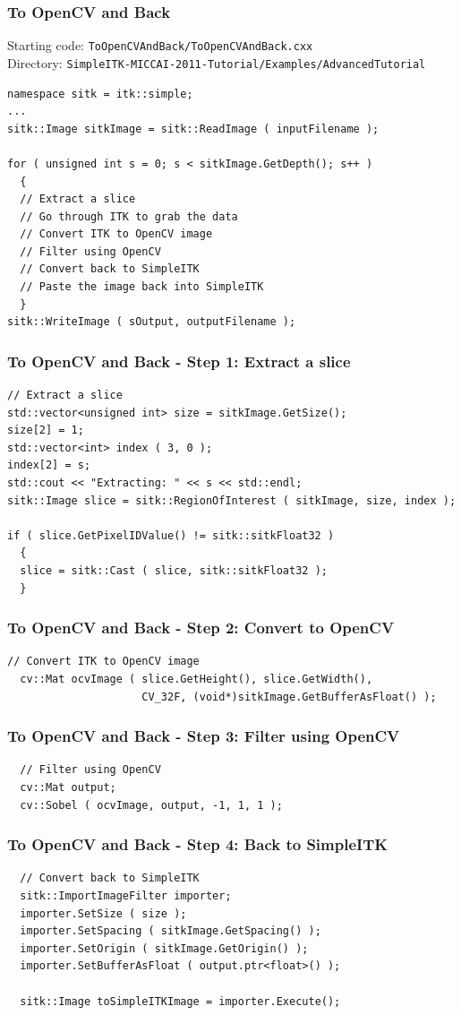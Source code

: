 \begin{frame}[fragile]
\frametitle{To OpenCV and Back}
Starting code: \texttt{ToOpenCVAndBack/ToOpenCVAndBack.cxx}\\
Directory: \texttt{SimpleITK-MICCAI-2011-Tutorial/Examples/AdvancedTutorial}
\begin{lstlisting}
namespace sitk = itk::simple;
...
sitk::Image sitkImage = sitk::ReadImage ( inputFilename );

for ( unsigned int s = 0; s < sitkImage.GetDepth(); s++ )
  {
  // Extract a slice
  // Go through ITK to grab the data
  // Convert ITK to OpenCV image
  // Filter using OpenCV
  // Convert back to SimpleITK
  // Paste the image back into SimpleITK
  }
sitk::WriteImage ( sOutput, outputFilename );
\end{lstlisting}
\end{frame}

\begin{frame}[fragile]
\frametitle{To OpenCV and Back - Step 1: Extract a slice}
\begin{lstlisting}
// Extract a slice
std::vector<unsigned int> size = sitkImage.GetSize();
size[2] = 1;
std::vector<int> index ( 3, 0 );
index[2] = s;
std::cout << "Extracting: " << s << std::endl;
sitk::Image slice = sitk::RegionOfInterest ( sitkImage, size, index );

if ( slice.GetPixelIDValue() != sitk::sitkFloat32 )
  {
  slice = sitk::Cast ( slice, sitk::sitkFloat32 );
  }
\end{lstlisting}
\end{frame}

\begin{frame}[fragile]
\frametitle{To OpenCV and Back - Step 2: Convert to OpenCV}
\begin{lstlisting}
// Convert ITK to OpenCV image
  cv::Mat ocvImage ( slice.GetHeight(), slice.GetWidth(),
                     CV_32F, (void*)sitkImage.GetBufferAsFloat() );
\end{lstlisting}
\end{frame}

\begin{frame}[fragile]
\frametitle{To OpenCV and Back - Step 3: Filter using OpenCV}
\begin{lstlisting}
  // Filter using OpenCV
  cv::Mat output;
  cv::Sobel ( ocvImage, output, -1, 1, 1 );
\end{lstlisting}
\end{frame}

\begin{frame}[fragile]
\frametitle{To OpenCV and Back - Step 4: Back to SimpleITK}
\begin{lstlisting}
  // Convert back to SimpleITK
  sitk::ImportImageFilter importer;
  importer.SetSize ( size );
  importer.SetSpacing ( sitkImage.GetSpacing() );
  importer.SetOrigin ( sitkImage.GetOrigin() );
  importer.SetBufferAsFloat ( output.ptr<float>() );

  sitk::Image toSimpleITKImage = importer.Execute();
\end{lstlisting}
\end{frame}

